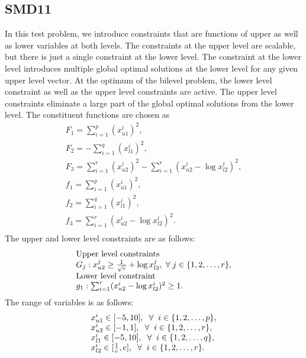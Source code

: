 \documentclass[twoside]{article}
\begin{document}
\subsection{SMD11}
In this test problem, we introduce constraints that are functions of upper as well as lower variables at both levels. The constraints at the upper level are scalable, but there is just a single constraint at the lower level. The constraint at the lower level introduces multiple global optimal solutions at the lower level for any given upper level vector. At the optimum of the bilevel problem, the lower level constraint as well as the upper level constraints are active. The upper level constraints eliminate a large part of the global optimal solutions from the lower level. The constituent functions are chosen as
\begin{equation}
\begin{array}{l}
F_1 = \sum_{i=1}^{p} (x_{u1}^{i})^2,\\
F_2 = - \sum_{i=1}^{q} (x_{l1}^{i})^2,\\
F_3 = \sum_{i=1}^{r} (x_{u2}^{i})^2 - \sum_{i=1}^{r} (x_{u2}^{i} - \log x_{l2}^{i})^2,\\
f_1 = \sum_{i=1}^{p} (x_{u1}^{i})^2,\\
f_2 = \sum_{i=1}^{q} (x_{l1}^{i})^2,\\
f_3 = \sum_{i=1}^{r} (x_{u2}^{i} - \log x_{l2}^{i})^2.\\
\end{array}
\end{equation}
The upper and lower level constraints are as follows:
\begin{equation}
\begin{array}{l}
\mbox{Upper level constraints}\\
G_j: x_{u2}^{j} \ge \frac{1}{\sqrt{r}} + \log x_{l2}^{j}, \hspace{1mm} \forall \hspace{1mm} j \in \{1,2,\ldots,r\},\\
\mbox{Lower level constraint}\\
g_1: \sum_{i=1}^{r} (x_{u2}^{i} - \log x_{l2}^{i})^2 \ge 1.\\
\end{array}
\end{equation}
The range of variables is as follows:
\begin{equation}
\begin{array}{l}
x_{u1}^{i} \in [-5,10], \hspace{2mm} \forall \hspace{2mm} i \in \{1,2,\ldots,p\},\\
x_{u2}^{i} \in [-1,1], \hspace{2mm} \forall \hspace{2mm} i \in \{1,2,\ldots,r\},\\
x_{l1}^{i} \in [-5,10], \hspace{2mm} \forall \hspace{2mm} i \in \{1,2,\ldots,q\},\\
x_{l2}^{i} \in [\frac{1}{e},e], \hspace{2mm} \forall \hspace{2mm} i \in \{1,2,\ldots,r\}.
\end{array}
\end{equation}
\end{document}

